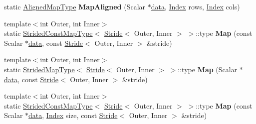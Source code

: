 \begin{Indent}
\begin{DoxyCompactItemize}
static \hyperlink{group___core___module_class_eigen_1_1_map}{Aligned\+Map\+Type} {\bfseries Map\+Aligned} (Scalar $\ast$\hyperlink{class_eigen_1_1_plain_object_base_ac25699535374b1854cf8494e44ad31b2}{data}, \hyperlink{namespace_eigen_a62e77e0933482dafde8fe197d9a2cfde}{Index} rows, \hyperlink{namespace_eigen_a62e77e0933482dafde8fe197d9a2cfde}{Index} cols)
\item 
\mbox{\label{class_eigen_1_1_plain_object_base_a8ed320f4d926ab401117564cafc3e232}} 
{\footnotesize template$<$int Outer, int Inner$>$ }\\static \hyperlink{struct_eigen_1_1_plain_object_base_1_1_strided_const_map_type}{Strided\+Const\+Map\+Type}$<$ \hyperlink{group___core___module_class_eigen_1_1_stride}{Stride}$<$ Outer, Inner $>$ $>$\+::type {\bfseries Map} (const Scalar $\ast$\hyperlink{class_eigen_1_1_plain_object_base_ac25699535374b1854cf8494e44ad31b2}{data}, const \hyperlink{group___core___module_class_eigen_1_1_stride}{Stride}$<$ Outer, Inner $>$ \&stride)
\item 
\mbox{\label{class_eigen_1_1_plain_object_base_a240ab54b8839d02bdd35e358a3d66b73}} 
{\footnotesize template$<$int Outer, int Inner$>$ }\\static \hyperlink{struct_eigen_1_1_plain_object_base_1_1_strided_map_type}{Strided\+Map\+Type}$<$ \hyperlink{group___core___module_class_eigen_1_1_stride}{Stride}$<$ Outer, Inner $>$ $>$\+::type {\bfseries Map} (Scalar $\ast$\hyperlink{class_eigen_1_1_plain_object_base_ac25699535374b1854cf8494e44ad31b2}{data}, const \hyperlink{group___core___module_class_eigen_1_1_stride}{Stride}$<$ Outer, Inner $>$ \&stride)
\item 
\mbox{\label{class_eigen_1_1_plain_object_base_aebf9df309b9b6f4e5cc0d495a423f749}} 
{\footnotesize template$<$int Outer, int Inner$>$ }\\static \hyperlink{struct_eigen_1_1_plain_object_base_1_1_strided_const_map_type}{Strided\+Const\+Map\+Type}$<$ \hyperlink{group___core___module_class_eigen_1_1_stride}{Stride}$<$ Outer, Inner $>$ $>$\+::type {\bfseries Map} (const Scalar $\ast$\hyperlink{class_eigen_1_1_plain_object_base_ac25699535374b1854cf8494e44ad31b2}{data}, \hyperlink{namespace_eigen_a62e77e0933482dafde8fe197d9a2cfde}{Index} size, const \hyperlink{group___core___module_class_eigen_1_1_stride}{Stride}$<$ Outer, Inner $>$ \&stride)

\end{DoxyCompactItemize}
\end{Indent}
